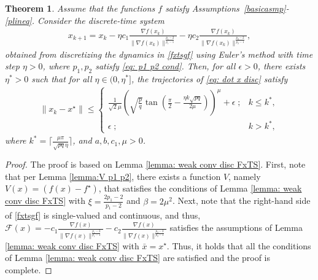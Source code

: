 \documentclass[letterpaper]{article}
\newtheorem{theorem}{Theorem}
\begin{document}
\begin{theorem}\label{thm: discretized}
Assume that the functions $f$ satisfy Assumptions~\ref{basicasmp}-\ref{plineq}. Consider the discrete-time system
\begin{align}\label{eq: dot x disc}
    x_{k+1} = x_k -\eta c_1\frac{\nabla f(x_k)}{\|\nabla f(x_k)\|^{\frac{p_1-2}{p_1-1}}} -\eta c_2\frac{\nabla f(x_k)}{\|\nabla f(x_k)\|^{\frac{p_2-2}{p_2-1}}},
\end{align}
obtained from discretizing the dynamics in \eqref{fxtsgf} using Euler's method with time step $\eta>0$, where $p_1, p_2$ satisfy \eqref{eq: p1 p2 cond}. Then, for all $\epsilon>0$, there exists $\eta^*>0$ such that for all $\eta\in (0, \eta^*]$, the trajectories of \eqref{eq: dot x disc} satisfy {\small
\begin{align}\label{eq: disc bound}
    \|x_k-x^\star\|\leq \begin{cases}
   \frac{1}{\sqrt{2}\mu}\left(\!\sqrt{\frac{p}{q}}\tan\left(\frac{\pi}{2}\!-\!\frac{\eta k\sqrt{pq}}{2\mu}\!\right)\right)^{\mu}\!+\!\epsilon\; ; & k\leq k^*,\\
    \epsilon \; ; & k > k^*,
    \end{cases}
\end{align}}\normalsize
where $k^* = \lceil \frac{\mu\pi}{\sqrt{pq}\eta} \rceil$, and $a, b, c_1, \mu>0$.
\end{theorem}
\begin{proof}
The proof is based on Lemma \ref{lemma: weak conv disc FxTS}. First, note that per Lemma \ref{lemma:V p1 p2}, there exists a function $V$, namely $V(x) = (f(x)-f^\star)$, that satisfies the conditions of Lemma \ref{lemma: weak conv disc FxTS} with $\xi = \frac{2p_1-2}{p_1-2}$ and $\beta = 2\mu^2$. Next, note that the right-hand side of \eqref{fxtsgf} is single-valued and continuous, and thus, $\mathcal F(x) = -c_1\frac{\nabla f(x)}{\|\nabla f(x)\|^{\frac{p_1-2}{p_1-1}}} -c_2\frac{\nabla f(x)}{\|\nabla f(x)\|^{\frac{p_2-2}{p_2-1}}}$ satisfies the assumptions of Lemma \ref{lemma: weak conv disc FxTS}  with $\bar x = x^\star$. Thus, it holds that all the conditions of Lemma \ref{lemma: weak conv disc FxTS} are satisfied and the proof is complete.
\end{proof}

\end{document}
